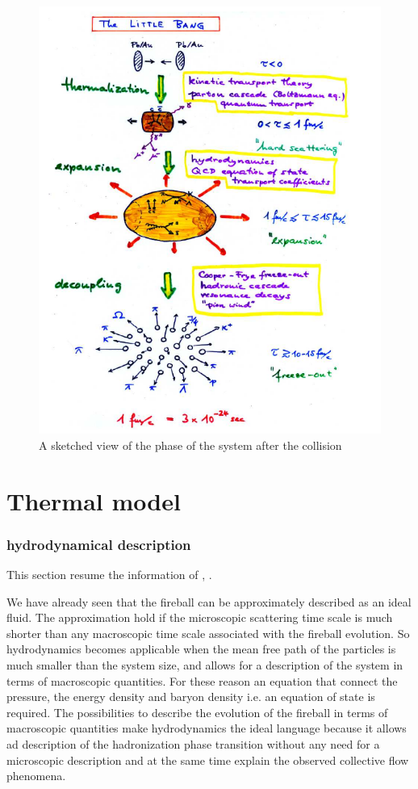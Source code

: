 \documentclass[12pt,a4paper]{book}
\begin{document}
	\begin{figure}[ht]
		\centering
		\includegraphics[width=0.7\linewidth]{pictures/collision_stage.png}
		\caption{A sketched view of the phase of the system after the collision}
		\label{fig::collision_stage} 
	\end{figure}
	
	
	\chapter{Thermal model}
	\subsection{hydrodynamical description}
	This section resume the information of \cite{heinz2004conceptsheavyionphysics}, \cite{phdthesis}.
	
	We have already seen that the fireball can be approximately described as an ideal fluid. The approximation hold if the microscopic scattering time scale is much shorter than any macroscopic time scale associated with the fireball evolution. So hydrodynamics becomes applicable when the mean free path of the particles is much smaller than the system size, and allows for a description of the system in terms of macroscopic quantities. For these reason an equation that connect the pressure, the energy density and baryon density i.e. an equation of state is required. The possibilities to describe the evolution of the fireball in terms of macroscopic quantities make hydrodynamics the ideal language because it allows ad description of the hadronization phase transition without any need for a microscopic description and at the same time explain the observed collective flow phenomena.
	
\end{document}
